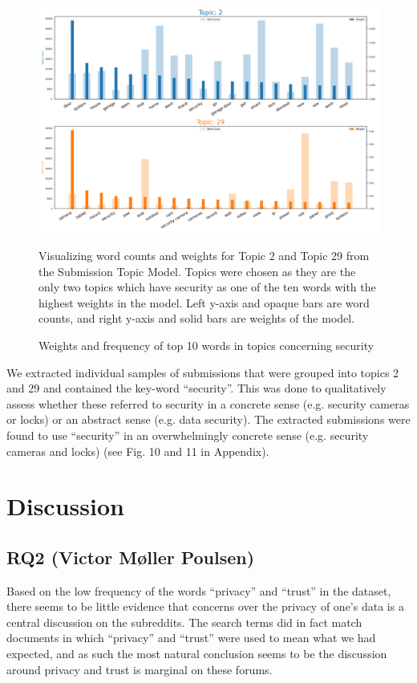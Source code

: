 \documentclass{article}
\begin{document}
    \begin{figure}[H]
        \begin{centering}
        \includegraphics[width = \textwidth]{../Figure/H2_topic_weight_prelim.png}
        \caption{Weights and frequency of top 10 words in topics concerning security}
        \end{centering}
        \begin{footnotesize} 
            Visualizing word counts and weights for Topic 2 and Topic 29 from the Submission Topic Model. Topics were chosen as they are the only two topics which have security as one of the ten words with the highest weights in the model. Left y-axis and opaque bars are word counts, and right y-axis and solid bars are weights of the model. 
        \end{footnotesize}
    \end{figure}

    We extracted individual samples of submissions that were grouped into topics 2 and 29 and contained the key-word “security”. This was done to qualitatively assess whether these referred to security in a concrete sense (e.g. security cameras or locks) or an abstract sense (e.g. data security). The extracted submissions were found to use “security” in an overwhelmingly concrete sense (e.g. security cameras and locks) (see Fig. 10 and 11 in Appendix). 

    \section{Discussion}
    \subsection{RQ2 (Victor Møller Poulsen)}
    Based on the low frequency of the words “privacy” and “trust” in the dataset, there seems to be little evidence that concerns over the privacy of one's data is a central discussion on the subreddits. The search terms did in fact match documents in which “privacy” and “trust” were used to mean what we had expected, and as such the most natural conclusion seems to be the discussion around privacy and trust is marginal on these forums. 
\end{document}

